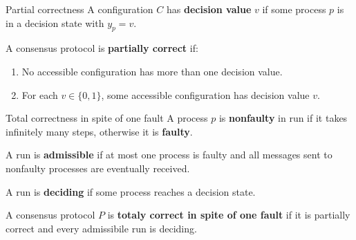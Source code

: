 \documentclass[12pt]{beamer}
\begin{document}
  \begin{frame}{Partial correctness}
    A configuration \(C\) has \textbf{decision value} \(v\) if some process \(p\) is in a decision state with \(y_p = v\).

    \vspace{0.25cm}

    \begin{definition}
      A consensus protocol is \textbf{partially correct} if:
      \begin{enumerate}
        \item No accessible configuration has more than one decision value.
        \item For each \(v\in \{0,1\}\), some accessible configuration has decision value \(v\).
      \end{enumerate}
    \end{definition}
  \end{frame}

  \begin{frame}{Total correctness in spite of one fault}
    A process \(p\) is \textbf{nonfaulty} in run if it takes infinitely many steps, otherwise it is \textbf{faulty}.

    \vspace{0.25cm}

    A run is \textbf{admissible} if at most one process is faulty and all messages sent to nonfaulty processes are eventually received.

    \vspace{0.25cm}

    A run is \textbf{deciding} if some process reaches a decision state.

    \vspace{0.25cm}

    \begin{definition}
      A consensus protocol \(P\) is \textbf{totaly correct in spite of one fault} if it is partially correct and every admissibile run is deciding.
    \end{definition}
  \end{frame}
\end{document}
